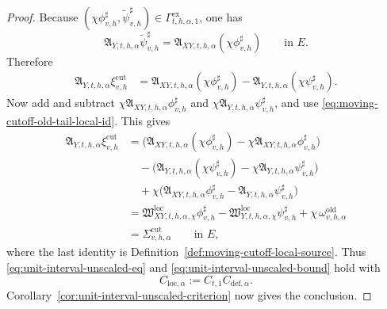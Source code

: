 \documentclass[11pt,a4paper]{amsart}
\theoremstyle{plain}
\theoremstyle{definition}
\theoremstyle{remark}
\begin{document}
\begin{proof}
Because \((\chi\phi_{v,h}^{\sharp},\widetilde\psi_{v,h}^{\sharp})\in\Gamma_{t,h,\alpha,1}^{\mathrm{ex}}\),
one has
\[
\mathfrak A_{Y,t,h,\alpha}\widetilde\psi_{v,h}^{\sharp}
=
\mathfrak A_{XY,t,h,\alpha}(\chi\phi_{v,h}^{\sharp})
\qquad\text{in }E.
\]
Therefore
\begin{align*}
\mathfrak A_{Y,t,h,\alpha}\xi_{v,h}^{\mathrm{cut}}
&=
\mathfrak A_{XY,t,h,\alpha}(\chi\phi_{v,h}^{\sharp})
-\mathfrak A_{Y,t,h,\alpha}(\chi\psi_{v,h}^{\sharp}).
\end{align*}
Now add and subtract \(\chi\mathfrak A_{XY,t,h,\alpha}\phi_{v,h}^{\sharp}\) and
\(\chi\mathfrak A_{Y,t,h,\alpha}\psi_{v,h}^{\sharp}\), and use
\eqref{eq:moving-cutoff-old-tail-local-id}. This gives
\begin{align*}
\mathfrak A_{Y,t,h,\alpha}\xi_{v,h}^{\mathrm{cut}}
&=
\bigl(
\mathfrak A_{XY,t,h,\alpha}(\chi\phi_{v,h}^{\sharp})
-\chi\mathfrak A_{XY,t,h,\alpha}\phi_{v,h}^{\sharp}
\bigr) \\
&\quad-
\bigl(
\mathfrak A_{Y,t,h,\alpha}(\chi\psi_{v,h}^{\sharp})
-\chi\mathfrak A_{Y,t,h,\alpha}\psi_{v,h}^{\sharp}
\bigr) \\
&\quad+
\chi\bigl(
\mathfrak A_{XY,t,h,\alpha}\phi_{v,h}^{\sharp}
-\mathfrak A_{Y,t,h,\alpha}\psi_{v,h}^{\sharp}
\bigr) \\
&=
\mathfrak W_{XY,t,h,\alpha,\chi}^{\mathrm{loc}}\phi_{v,h}^{\sharp}
-\mathfrak W_{Y,t,h,\alpha,\chi}^{\mathrm{loc}}\psi_{v,h}^{\sharp}
+\chi\,\omega_{v,h,\alpha}^{\mathrm{old}} \\
&=
\Sigma_{v,h,\alpha}^{\mathrm{cut}}
\qquad\text{in }E,
\end{align*}
where the last identity is Definition~\ref{def:moving-cutoff-local-source}. Thus
\eqref{eq:unit-interval-unscaled-eq} and \eqref{eq:unit-interval-unscaled-bound} hold with
\[
C_{\mathrm{loc},\alpha}:=C_{t,1}C_{\mathrm{def},\alpha}.
\]
Corollary~\ref{cor:unit-interval-unscaled-criterion} now gives the conclusion.
\end{proof}
\end{document}
